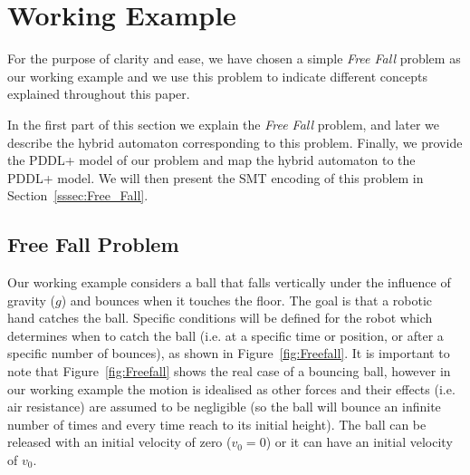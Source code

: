\section{Working Example}\label{sec:working_example}

For the purpose of clarity and ease, we have chosen a simple \emph{Free Fall} problem as our working example and we use this problem to indicate different concepts explained throughout this paper. 

In the first part of this section we explain the \emph{Free Fall} problem, and later we describe the hybrid automaton corresponding to this problem. Finally, we provide the PDDL+  model of our problem and map the hybrid automaton to the PDDL+ model. We will then present the SMT encoding of this problem in Section~\ref{sssec:Free_Fall}.

\subsection{Free Fall Problem}


Our working example considers a ball that falls vertically under the influence of gravity ($g$) and bounces when it touches the floor. The goal is that a robotic hand catches the ball. Specific conditions will be defined for the robot which determines when to catch the ball (i.e. at a specific time or position, or after a specific number of bounces), as shown in Figure~\ref{fig:Freefall}. It is important to note that Figure~\ref{fig:Freefall} shows the real case of a bouncing ball, however in our working example the motion is idealised as other forces and their effects (i.e. air resistance) are assumed to be negligible (so the ball will bounce an infinite number of times and every time reach to its initial height). The ball can be released with an initial velocity of zero ($v_0 = 0$) or it can have an initial velocity of $v_0$.

